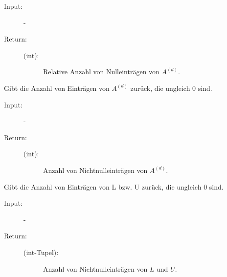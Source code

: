 \documentclass[letterpaper,10pt,ngerman, oneside, openright]{sphinxmanual}
\begin{document}
\begin{fulllineitems}
\begin{fulllineitems}
\begin{description}
\item [{Input:}] -
\end{description}
\begin{description}
\item[{Return:}] \leavevmode\begin{description}
\item[{(int):}] \leavevmode
Relative Anzahl von Nulleinträgen von $A^{(d)}$.

\end{description}

\end{description}

\end{fulllineitems}


\begin{fulllineitems}
\label{\detokenize{index:sparse_erw.Sparse.anz_nn_abs}}
Gibt die Anzahl von Einträgen von $A^{(d)}$ zurück, die ungleich 0 sind.

\begin{description}
\item [{Input:}] -
\end{description}
\begin{description}
\item[{Return:}] \leavevmode\begin{description}
\item[{(int):}] \leavevmode
Anzahl von Nichtnulleinträgen von $A^{(d)}$.

\end{description}

\end{description}

\end{fulllineitems}


\begin{fulllineitems}
\label{\detokenize{index:sparse_erw.Sparse.anz_nn_lu_abs}}
Gibt die Anzahl von Einträgen von L bzw. U zurück, die ungleich 0 sind.

\begin{description}
\item [{Input:}] -
\end{description}
\begin{description}
\item[{Return:}] \leavevmode\begin{description}
\item[{(int-Tupel):}] \leavevmode
Anzahl von Nichtnulleinträgen von $L$ und $U$.


\end{description}
\end{description}
\end{fulllineitems}
\end{fulllineitems}
\end{document}
